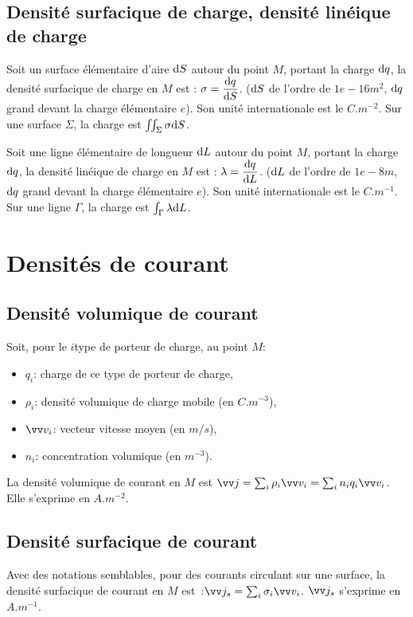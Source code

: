 \subsection{Densité surfacique de charge, densité linéique de charge}%
\label{chap9-subsec:densitesurfacique}%

Soit un surface élémentaire d'aire \(\mathrm{d} S\) autour du point \(M\), portant la 
charge \(\mathrm{d} q\), la densité surfacique de charge en \(M\) est : \(\sigma = 
\dfrac{\mathrm{d} q}{\mathrm{d} S}\). (\(\mathrm{d} S\) de l'ordre de \(\si{1e-16}{m^2}\), \(\mathrm{d} q\) grand 
devant la charge élémentaire \(e\)). Son unité internationale est le 
\(\si{C.m^{-2}}\). Sur une surface \(\Sigma\), la charge est \(\iint_\Sigma 
\sigma \mathrm{d} S\).

Soit une ligne élémentaire de longueur \(\mathrm{d} L\) autour du point \(M\), portant 
la charge \(\mathrm{d} q\), la densité linéique de charge en \(M\) est : \(\lambda = 
\dfrac{\mathrm{d} q}{\mathrm{d} L}\). (\(\mathrm{d} L\) de l'ordre de \(\si{1e-8}{m}\), \(\mathrm{d} q\) grand 
devant la charge élémentaire \(e\)). Son unité internationale est le 
\(\si{C.m^{-1}}\). Sur une ligne \(\Gamma\), la charge est \(\int_\Gamma 
\lambda \mathrm{d} L\).

\section{Densités de courant}%
\label{chap9-sec:densitedecourant}%

\subsection{Densité volumique de courant}%
\label{chap9-subsec:densitevolumique}%

Soit, pour le \(i\)\ieme type de porteur de charge, au point \(M\):
\begin{itemize}%
\item \(q_i\): charge de ce type de porteur de charge,
\item \(\rho_i\): densité volumique de charge mobile (en \(\si{C.m^{-3}}\)),
\item \(\vvv_i\): vecteur vitesse moyen (en \(\si{m/s}\)),
\item \(n_i\): concentration volumique (en \(\si{m^{-3}}\)).
\end{itemize}%
La densité volumique de courant en \(M\) est \(\vj = \sum_i \rho_i \vvv_i = 
\sum_i n_i q_i \vvv_i\). Elle s'exprime en \(\si{A.m^{-2}}\).

\subsection{Densité surfacique de courant}%
\label{chap9-subsec:Densité_surfacique_de_courant}%
Avec des notations semblables, pour des courants circulant sur une surface, la 
densité surfacique de courant en \(M\) est~:\(\vj_s = \sum_i \sigma_i \vvv_i\).
\(\vj_s\) s'exprime en \(\si{A.m^{-1}}\).

